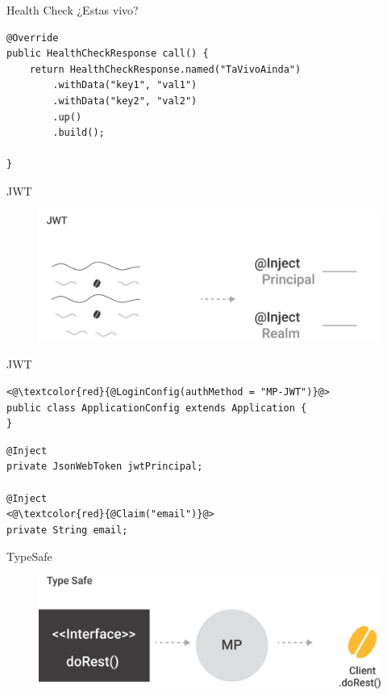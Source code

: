 \documentclass[aspectratio=169]{beamer}
\begin{document}
\begin{frame}[fragile]{Health Check}
¿Estas vivo?
\begin{lstlisting}
@Override
public HealthCheckResponse call() {
    return HealthCheckResponse.named("TaVivoAinda")
        .withData("key1", "val1")
        .withData("key2", "val2")
        .up()
        .build();

}
\end{lstlisting}

\end{frame}


\begin{frame}{JWT}
\begin{figure}
	\centering
	\includegraphics[width=0.9\linewidth]{Images/jwt}
\end{figure}
\end{frame}


\begin{frame}[fragile]{JWT}

\begin{lstlisting}
<@\textcolor{red}{@LoginConfig(authMethod = "MP-JWT")}@>
public class ApplicationConfig extends Application {
}
\end{lstlisting}

\begin{lstlisting}
@Inject
private JsonWebToken jwtPrincipal;

@Inject
<@\textcolor{red}{@Claim("email")}@>
private String email;
\end{lstlisting}
\end{frame}

\begin{frame}{TypeSafe}
\begin{figure}
	\centering
	\includegraphics[width=0.75\linewidth]{Images/typesafe}
\end{figure}
\end{frame}
\end{document}

